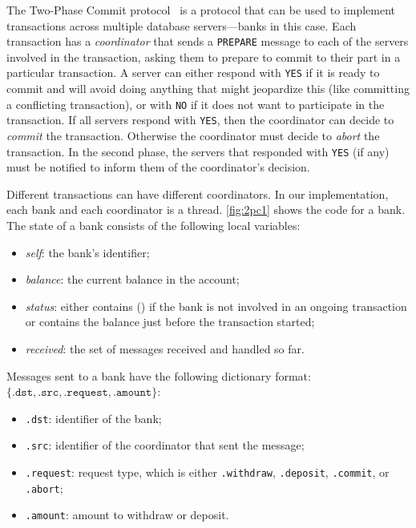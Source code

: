 \documentclass{report}
\begin{document}
The Two-Phase Commit protocol~\cite{Gray78} is a protocol that can be
used to implement transactions across multiple database servers---banks
in this case.
Each transaction has a \emph{coordinator} that sends a \texttt{PREPARE}
message to each of the servers involved in the transaction, asking them
to prepare to commit to their part in a particular transaction.
A server can either respond with
\texttt{YES} if it is ready to commit and will avoid doing anything
that might jeopardize this (like committing a conflicting transaction),
or with \texttt{NO} if it does not want to participate in the transaction.
If all servers respond with \texttt{YES}, then the coordinator can
decide to \emph{commit} the transaction.  Otherwise the coordinator
must decide to \emph{abort} the transaction.  In the second phase, the
servers that responded with \texttt{YES} (if any) must be notified
to inform them of the coordinator's decision.

Different transactions can have different coordinators.  In our
implementation, each bank and each coordinator is a thread.
\autoref{fig:2pc1} shows the code for a bank.
The state of a bank consists of the following local variables:
\begin{itemize}
\item \textit{self}: the bank's identifier;
\item \textit{balance}: the current balance in the account;
\item \textit{status}: either contains () if the bank is not involved in an
ongoing transaction or contains the balance
just before the transaction started;
\item \textit{received}: the set of messages received and handled so far.
\end{itemize}

\noindent
Messages sent to a bank have the following dictionary format:
$\{ \mathtt{.dst}, \mathtt{.src}, \mathtt{.request}, \mathtt{.amount} \}$:
\begin{itemize}
\item \texttt{.dst}: identifier of the bank;
\item \texttt{.src}: identifier of the coordinator that sent the message;
\item \texttt{.request}: request type, which is either
\texttt{.withdraw}, \texttt{.deposit}, \texttt{.commit}, or \texttt{.abort};
\item \texttt{.amount}: amount to withdraw or deposit.
\end{itemize}
\end{document}
